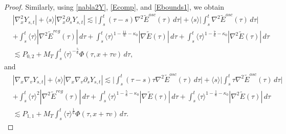 \documentclass[10pt,a4paper]{amsart}
\theoremstyle{plain}
\begin{document}
\begin{proof}
	Similarly, using \eqref{nabla2Y},
	\eqref{Ecomp}, and \eqref{Ebounds1}, we obtain
	\begin{equation}\label{Ysu4}
		\begin{split}
			&|\nabla_x^2Y_{s,t}|+\langle s\rangle|\nabla_x^2\partial_sY_{s,t}|
			\lesssim\Big|\int_s^t(\tau-s)\nabla^2\widetilde E^{osc}(\tau)\,d\tau\Big|
			+\langle s\rangle\Big|\int_s^t\nabla^2\widetilde E^{osc}(\tau)\,d\tau\Big|\\
			&+\int_s^t\langle\tau\rangle|\nabla^2\widetilde E^{reg}(\tau)|\,d\tau+\int_s^t\langle\tau\rangle^{1-\frac{11}{6}-\kappa_0}
			|\nabla\widetilde E(\tau)|\,d\tau+\int_s^t\langle\tau\rangle^{1-\frac{7}{6}-\kappa_0}|\nabla^2\widetilde E(\tau)|\,d\tau\\
			&\lesssim
			P_{0,2}
			+M_T\int_s^t
			\langle\tau\rangle^{-\frac56}
			\Phi(\tau,x+\tau v)\,d\tau,
		\end{split}
	\end{equation}
	and
	\begin{equation}\label{Ysu5}
		\begin{split}
			&|\nabla_x\nabla_vY_{s,t}|+\langle s\rangle|\nabla_x\nabla_v\partial_sY_{s,t}|
			\lesssim\Big|\int_s^t(\tau-s)\tau
			\nabla^2\widetilde E^{osc}(\tau)\,d\tau\Big|+\langle s\rangle
			\Big|\int_s^t\tau\nabla^2\widetilde E^{osc}(\tau)\,d\tau\Big|\\
			&+\int_s^t\langle\tau\rangle^2
			|\nabla^2\widetilde E^{reg}(\tau)|\,d\tau+\int_s^t\langle\tau\rangle^{1-\frac56-\kappa_0}
			|\nabla\widetilde E(\tau)|\,d\tau+\int_s^t
			\langle\tau\rangle^{1-\frac16-\kappa_0}
			|\nabla^2\widetilde E(\tau)|\,d\tau\\
			&\lesssim P_{1,1}+M_T\int_s^t\langle\tau\rangle^{\frac16}\Phi(\tau,x+\tau v)\,d\tau.
		\end{split}
	\end{equation}
	

\end{proof}
\end{document}
